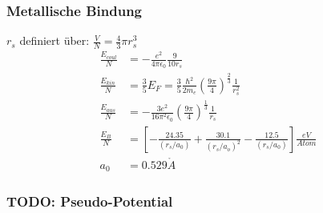 \subsubsection*{Metallische Bindung}
$r_s$ definiert über: $\frac{V}{N} = \frac{4}{3} \pi r_s^3$
\begin{equation*}
    \begin{aligned}
        \frac{E_{coul}}{N} &= - \frac{e^2}{4 \pi \epsilon_0} \frac{9}{10r_s} \\
        \frac{E_{kin}}{N} &= \frac{3}{5} E_F = \frac{3}{5} \frac{\hbar^2}{2m_e} \left(\frac{9 \pi }{4}\right)^{\frac{2}{3}} \frac{1}{r_s^2}\\
        \frac{E_{aus}}{N} &= - \frac{3e^2}{16 \pi^2 \epsilon_0} \left(\frac{9 \pi}{4}\right)^{\frac{1}{3}} \frac{1}{r_s} \\
        \frac{E_B}{N} &= \left[-\frac{24.35}{(r_s/a_0)} + \frac{30.1}{(r_s/a_o)^2} - \frac{12.5}{(r_s/a_0)}\right] \frac{eV}{Atom} \\
        a_0 &= 0.529 \mathring{A}
    \end{aligned}
\end{equation*}

\subsubsection*{TODO: Pseudo-Potential}